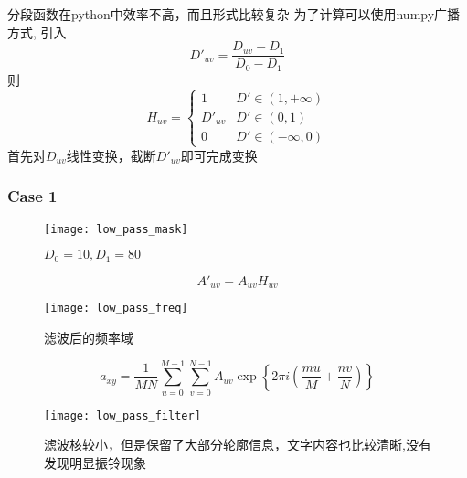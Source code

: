 \documentclass{myreport}
\begin{document}
      分段函数在python中效率不高，而且形式比较复杂
      为了计算可以使用numpy广播方式,
      引入
      \begin{equation}
        D'_{uv} = \frac{D_{uv}-D_1}{D_0 - D_1}
      \end{equation}
      则
      \begin{equation}
        H_{uv} = \begin{cases}
          1 & D' \in (1,+\infty) \\
          D'_{uv} & D' \in (0,1) \\
          0 & D' \in (-\infty,0)
        \end{cases}
      \end{equation}
      首先对$D_{uv}$线性变换，截断$D'_{uv}$即可完成变换
      \subsubsection{Case 1}
        \begin{figure}[H]
          \centering
          \texttt{[image: low\_pass\_mask]}
          \caption{$D_0 = 10, D_1 = 80$}
          \label{fig:low_pass_mask}
        \end{figure}
        \begin{equation}
          A'_{uv} = A_{uv} H_{uv}
        \end{equation}
        \begin{figure}[H]
          \centering
          \texttt{[image: low\_pass\_freq]}
          \caption{滤波后的频率域}
          \label{fig:low_pass_freq}
        \end{figure}
        \begin{equation}
          a_{xy} = \frac{1}{MN}
          \sum_{u=0}^{M-1} \sum_{v=0}^{N-1} 
            A_{uv} \exp\left\{
              2 \pi i \left(
                \frac{mu}{M} + \frac{nv}{N}
              \right)
            \right\}
        \end{equation}
        \begin{figure}[H]
          \centering
          \texttt{[image: low\_pass\_filter]}
          \caption{滤波核较小，但是保留了大部分轮廓信息，文字内容也比较清晰,没有发现明显振铃现象}
          \label{fig:low_pass_filter}
        \end{figure}
\end{document}
